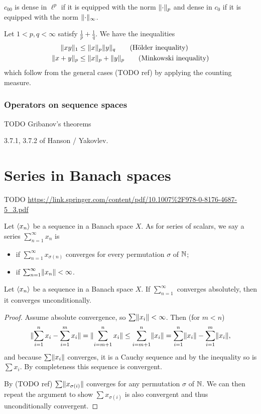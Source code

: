 \begin{lemma}
$c_{00}$ is dense in $\ell^p$ if it is equipped with the norm $\lVert\cdot\rVert_p$ and dense in $c_0$ if it is equipped with the norm $\lVert\cdot\rVert_\infty$.
\end{lemma}

Let $1<p,q<\infty$ satisfy $\frac{1}{p}+\frac{1}{q}$. We have the inequalities
\begin{align*}
\lVert xy\rVert_1 &\leq \lVert x\rVert_p\lVert y\rVert_q\qquad\text{(Hölder inequality)} \\
\lVert x+y\rVert_p &\leq \lVert x\rVert_p+\lVert y\rVert_p\qquad\text{(Minkowski inequality)}
\end{align*}
which follow from the general cases (TODO ref) by applying the counting measure.

\subsubsection{Operators on sequence spaces}
TODO Gribanov's theorems

3.7.1, 3.7.2 of Hanson / Yakovlev.

\section{Series in Banach spaces}
TODO
\url{https://link.springer.com/content/pdf/10.1007%2F978-0-8176-4687-5_3.pdf}
\begin{definition}
Let $\langle x_n \rangle$ be a sequence in a Banach space $X$. As for series of scalars, we say a series $\sum_{n=1}^\infty x_n$ is
\begin{itemize}
\item {} if $\sum_{n=1}^\infty x_{\sigma(n)}$ converges for every permutation $\sigma$ of $\mathbb{N}$;
\item {} if $\sum_{n=1}^\infty \lVert x_n\rVert < \infty$.
\end{itemize}
\end{definition}

\begin{proposition} \label{prop:absoluteUnconditionalConvergenceBanach}
Let $\langle x_n \rangle$ be a sequence in a Banach space $X$. If $\sum_{n=1}^\infty$ converges absolutely, then it converges unconditionally.
\end{proposition}
\begin{proof}
Assume absolute convergence, so $\sum\lVert x_i\rVert<\infty$. Then (for $m< n$)
\[ \lVert\sum_{i=1}^n x_i - \sum_{i=1}^m x_i\rVert = \lVert\sum_{i=m+1}^n x_i\rVert \leq \sum_{i=m+1}^n\lVert x_i\rVert = \sum_{i=1}^n \lVert x_i\rVert - \sum_{i=1}^m \lVert x_i\rVert, \]
and because $\sum\lVert x_i\rVert$ converges, it is a Cauchy sequence and by the inequality so is $\sum x_i$. By completeness this sequence is convergent.

By (TODO ref) $\sum\lVert x_{\sigma(i)}\rVert$ converges for any permutation $\sigma$ of $\mathbb{N}$. We can then repeat the argument to show $\sum x_{\sigma(i)}$ is also convergent and thus unconditionally convergent.
\end{proof}

